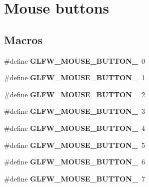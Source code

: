 \hypertarget{group__buttons}{}\section{Mouse buttons}
\label{group__buttons}
\subsection*{Macros}
\begin{DoxyCompactItemize}
\item 
\mbox{\label{group__buttons_ga181a6e875251fd8671654eff00f9112e}} 
\#define {\bfseries G\+L\+F\+W\+\_\+\+M\+O\+U\+S\+E\+\_\+\+B\+U\+T\+T\+O\+N\+\_}~0
\item 
\mbox{\label{group__buttons_ga604b39b92c88ce9bd332e97fc3f4156c}} 
\#define {\bfseries G\+L\+F\+W\+\_\+\+M\+O\+U\+S\+E\+\_\+\+B\+U\+T\+T\+O\+N\+\_}~1
\item 
\mbox{\label{group__buttons_ga0130d505563d0236a6f85545f19e1721}} 
\#define {\bfseries G\+L\+F\+W\+\_\+\+M\+O\+U\+S\+E\+\_\+\+B\+U\+T\+T\+O\+N\+\_}~2
\item 
\mbox{\label{group__buttons_ga53f4097bb01d5521c7d9513418c91ca9}} 
\#define {\bfseries G\+L\+F\+W\+\_\+\+M\+O\+U\+S\+E\+\_\+\+B\+U\+T\+T\+O\+N\+\_}~3
\item 
\mbox{\label{group__buttons_gaf08c4ddecb051d3d9667db1d5e417c9c}} 
\#define {\bfseries G\+L\+F\+W\+\_\+\+M\+O\+U\+S\+E\+\_\+\+B\+U\+T\+T\+O\+N\+\_}~4
\item 
\mbox{\label{group__buttons_gae8513e06aab8aa393b595f22c6d8257a}} 
\#define {\bfseries G\+L\+F\+W\+\_\+\+M\+O\+U\+S\+E\+\_\+\+B\+U\+T\+T\+O\+N\+\_}~5
\item 
\mbox{\label{group__buttons_ga8b02a1ab55dde45b3a3883d54ffd7dc7}} 
\#define {\bfseries G\+L\+F\+W\+\_\+\+M\+O\+U\+S\+E\+\_\+\+B\+U\+T\+T\+O\+N\+\_}~6
\item 
\mbox{\label{group__buttons_ga35d5c4263e0dc0d0a4731ca6c562f32c}} 
\#define {\bfseries G\+L\+F\+W\+\_\+\+M\+O\+U\+S\+E\+\_\+\+B\+U\+T\+T\+O\+N\+\_}~7

\end{DoxyCompactItemize}
